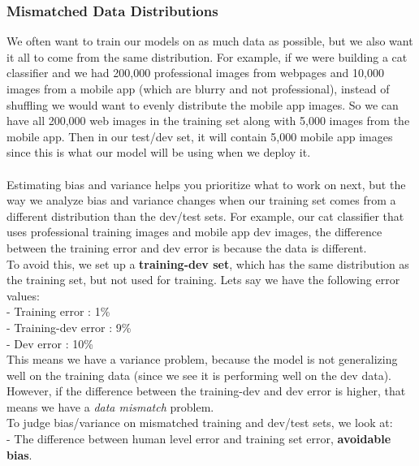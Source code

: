 \documentclass[11pt, a4paper]{article}
\begin{document}
\begin{spacing}{1.1}
	\subsubsection{Mismatched Data Distributions}
	We often want to train our models on as much data as possible, but we also want it all to come from the same distribution. For example, if we were building a cat classifier and we had 200,000 professional images from webpages and 10,000 images from a mobile app (which are blurry and not professional), instead of shuffling we would want to evenly distribute the mobile app images. So we can have all 200,000 web images in the training set along with 5,000 images from the mobile app. Then in our test/dev set, it will contain 5,000 mobile app images since this is what our model will be using when we deploy it. \\~\\
	Estimating bias and variance helps you prioritize what to work on next, but the way we analyze bias and variance changes when our training set comes from a different distribution than the dev/test sets. For example, our cat classifier that uses professional training images and mobile app dev images, the difference between the training error and dev error is because the data is different. \vspace*{1.5mm}\\ 
	To avoid this, we set up a \textbf{training-dev set}, which has the same distribution as the training set, but not used for training. Lets say we have the following error values: \\
	\hspace*{3mm} - Training error : 1\% \\
	\hspace*{3mm} - Training-dev error : 9\%\\
	\hspace*{3mm} - Dev error : 10\%\\
	This means we have a variance problem, because the model is not generalizing well on the training data (since we see it is performing well on the dev data). However, if the difference between the training-dev and dev error is higher, that means we have a \textit{data mismatch} problem. \vspace*{2mm} \\
	To judge bias/variance on mismatched training and dev/test sets, we look at: \vspace*{.5mm} \\
	\hspace*{3mm} - The difference between human level error and training set error, \textbf{avoidable bias}. \\

\end{spacing}
\end{document}
